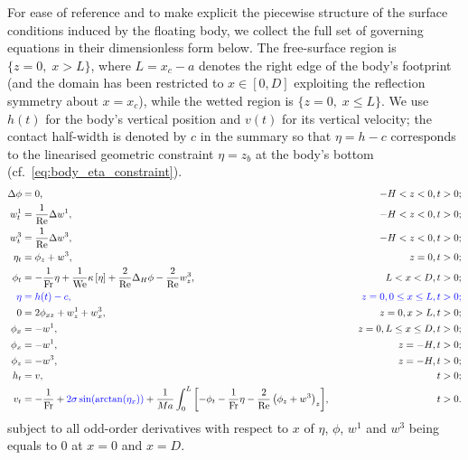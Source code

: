 \documentclass{article}
\newcommand{\Fr}{\mathrm{Fr}}
\newcommand{\We}{\mathrm{We}}
\newcommand{\Rey}{\mathrm{Re}}
\begin{document}
For ease of reference and to make explicit the piecewise structure of the surface conditions induced by the floating body, we collect the full set of governing equations in their dimensionless form below.
The free-surface region is $\{z = 0,\; x > L\}$, where $L = x_c - a$ denotes the right edge of the body's footprint (and the domain has been restricted to $x \in [0, D]$ exploiting the reflection symmetry about $x = x_c$), while the wetted region is $\{z = 0,\; x \leq L\}$.
We use $h(t)$ for the body's vertical position and $v(t)$ for its vertical velocity; the contact half-width is denoted by $c$ in the summary so that $\eta = h - c$ corresponds to the linearised geometric constraint $\eta = z_b$ at the body's bottom (cf.~\eqref{eq:body_eta_constraint}).
\begin{subequations}
\begin{align}
    \Delta \phi &=0,& -H<z<0,t>0;\\
    w^1_t &= \frac{1}{\Rey}\Delta w^1,& \qquad -H<z<0,t>0;\\
    w^3_t &= \frac{1}{\Rey}\Delta w^3,& \qquad -H<z<0,t>0;\\
    \eta_t &= \phi_z+w^3,& \qquad z=0,t>0;\\
    \phi_t &= -\frac{1}{\Fr}\eta+\frac{1}{\We}\kappa\left[\eta\right]+\frac{2}{\Rey}\Delta_H\phi-\frac{2}{\Rey}w^3_z,& \qquad L < x < D,t>0;\\
    \color{blue}\eta &\color{blue}= h(t)-c,&\color{blue} \qquad z=0,  0\leq x \leq L,t>0;\color{black}\\
    0&=2\phi_{xz}+w^1_z+w^3_x,&z=0,x>L,t>0;\\
     \phi_x &= -w^1,& \qquad z= 0, L\leq x\leq D,t>0; \\
    \phi_x &= -w^1,& \qquad z= -H,t>0; \\
    \phi_z &= -w^3,& \qquad z= -H,t>0; \\
    h_t &= v,& \qquad t>0;\\
    v_t &= -\frac{1}{\Fr} + {\color{blue}2\sigma \sin(\arctan(\eta_x))} + \frac{1}{Ma}\int_0^L{\left[-\phi_t-\frac{1}{\Fr}\eta-\frac{2}{\Rey}\left(\phi_z+w^3\right)_z\right]},& t>0.
\end{align}
\end{subequations}
subject to all odd-order derivatives with respect to $x$ of $\eta$, $\phi$, $w^1$ and $w^3$ being equals to $0$ at $x=0$ and $x=D$. 
\end{document}

